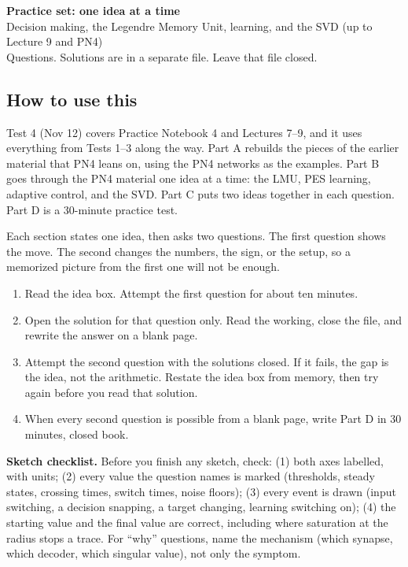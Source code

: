 \documentclass[11pt,letterpaper]{article}
\begin{document}
\begin{center}
{\Large\bfseries Practice set: one idea at a time}\\[2pt]
{\large Decision making, the Legendre Memory Unit, learning, and the SVD (up to Lecture 9 and PN4)}\\[4pt]
{\normalsize Questions. Solutions are in a separate file. Leave that file closed.}
\end{center}

\subsection*{How to use this}

Test 4 (Nov 12) covers Practice Notebook 4 and Lectures 7--9, and it uses everything from Tests 1--3 along the way. Part A rebuilds the pieces of the earlier material that PN4 leans on, using the PN4 networks as the examples. Part B goes through the PN4 material one idea at a time: the LMU, PES learning, adaptive control, and the SVD. Part C puts two ideas together in each question. Part D is a 30-minute practice test.

Each section states one idea, then asks two questions. The first question shows the move. The second changes the numbers, the sign, or the setup, so a memorized picture from the first one will not be enough.

\begin{enumerate}[leftmargin=1.4em]
\item Read the idea box. Attempt the first question for about ten minutes.
\item Open the solution for that question only. Read the working, close the file, and rewrite the answer on a blank page.
\item Attempt the second question with the solutions closed. If it fails, the gap is the idea, not the arithmetic. Restate the idea box from memory, then try again before you read that solution.
\item When every second question is possible from a blank page, write Part D in 30 minutes, closed book.
\end{enumerate}

\begin{trythis}
\textbf{Sketch checklist.} Before you finish any sketch, check:
(1) both axes labelled, with units;
(2) every value the question names is marked (thresholds, steady states, crossing times, switch times, noise floors);
(3) every event is drawn (input switching, a decision snapping, a target changing, learning switching on);
(4) the starting value and the final value are correct, including where saturation at the radius stops a trace.
For ``why'' questions, name the mechanism (which synapse, which decoder, which singular value), not only the symptom.
\end{trythis}
\end{document}
